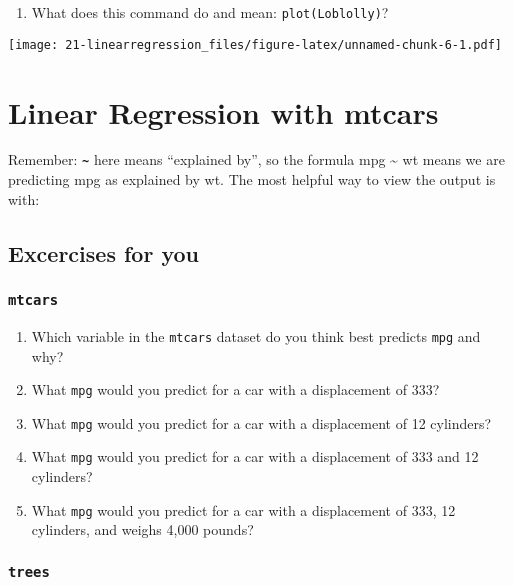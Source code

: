 \documentclass[
]{book}
\providecommand{\tightlist}{%
  \setlength{\itemsep}{0pt}\setlength{\parskip}{0pt}}
\begin{document}
\begin{enumerate}
\def\labelenumi{\arabic{enumi}.}
\setcounter{enumi}{9}
\tightlist
\item
  What does this command do and mean: \texttt{plot(Loblolly)}?
\end{enumerate}

\texttt{[image: 21-linearregression\_files/figure-latex/unnamed-chunk-6-1.pdf]}

\hypertarget{linear-regression-with-mtcars}{%
\chapter{Linear Regression with mtcars}\label{linear-regression-with-mtcars}}

Remember: \textbf{\texttt{\textasciitilde{}}} here means ``explained by'', so the formula mpg \textasciitilde{} wt means we are predicting mpg as explained by wt. The most helpful way to view the output is with:

\hypertarget{excercises-for-you}{%
\section{\texorpdfstring{Excercises for \textbf{you}}{Excercises for you}}\label{excercises-for-you}}

\hypertarget{mtcars}{%
\subsection{\texorpdfstring{\texttt{mtcars}}{mtcars}}\label{mtcars}}

\begin{enumerate}
\def\labelenumi{\arabic{enumi}.}
\tightlist
\item
  Which variable in the \texttt{mtcars} dataset do you think best predicts \texttt{mpg} and why?
\item
  What \texttt{mpg} would you predict for a car with a displacement of 333?
\item
  What \texttt{mpg} would you predict for a car with a displacement of 12 cylinders?
\item
  What \texttt{mpg} would you predict for a car with a displacement of 333 and 12 cylinders?
\item
  What \texttt{mpg} would you predict for a car with a displacement of 333, 12 cylinders, and weighs 4,000 pounds?
\end{enumerate}

\hypertarget{trees}{%
\subsection{\texorpdfstring{\texttt{trees}}{trees}}\label{trees}}
\end{document}
